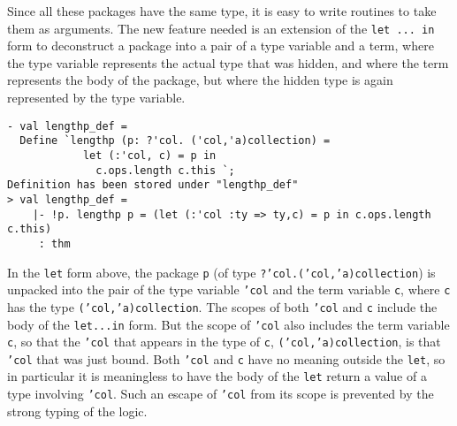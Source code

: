 Since all these packages have the same type, it is easy to write routines to take them
as arguments. The new feature needed is an extension of the \texttt{let~...~in} form
to deconstruct a package into a pair of a type variable and a term,
where the type variable represents the actual type that was hidden, and
where the term represents the body of the package, but where the hidden type
is again represented by the type variable.
\begin{session}
\begin{verbatim}
- val lengthp_def =
  Define `lengthp (p: ?'col. ('col,'a)collection) =
            let (:'col, c) = p in
              c.ops.length c.this `;
Definition has been stored under "lengthp_def"
> val lengthp_def =
    |- !p. lengthp p = (let (:'col :ty => ty,c) = p in c.ops.length c.this)
     : thm
\end{verbatim}
\end{session}


In the \texttt{let} form above,
the package \texttt{p} (of type
\texttt{?'col.('col,'a)collection})
is unpacked into the pair of the type variable \texttt{'col}
and the term variable \texttt{c}, where \texttt{c} has the type
\texttt{('col,'a)collection}.
The scopes of both \texttt{'col} and \texttt{c} include the body of the \texttt{let...in} form.
But the scope of \texttt{'col} also includes the term variable \texttt{c},
so that the \texttt{'col} that appears in the type of \texttt{c},
\texttt{('col,'a)collection}, is that \texttt{'col} that was just bound.
Both \texttt{'col} and \texttt{c}
have no meaning outside the \texttt{let}, so in particular it is meaningless
to have the body of the \texttt{let} return a value of a type involving
\texttt{'col}. Such an escape of \texttt{'col} from its scope is prevented
by the strong typing of the \HOLW{} logic.

